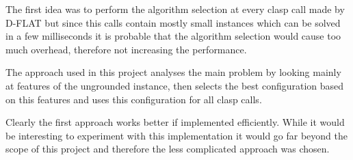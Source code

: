 The first idea was to perform the algorithm selection at every clasp call made by D-FLAT but since this calls contain mostly small instances which can be solved in a few milliseconds it is probable that the algorithm selection would cause too much overhead, therefore not increasing the performance.

The approach used in this project analyses the main problem by looking mainly at features of the ungrounded instance, then selects the best configuration based on this features and uses this configuration for all clasp calls.

Clearly the first approach works better if implemented efficiently. While it would be interesting to experiment with this implementation it would go far beyond the scope of this project and therefore the less complicated approach was chosen.
